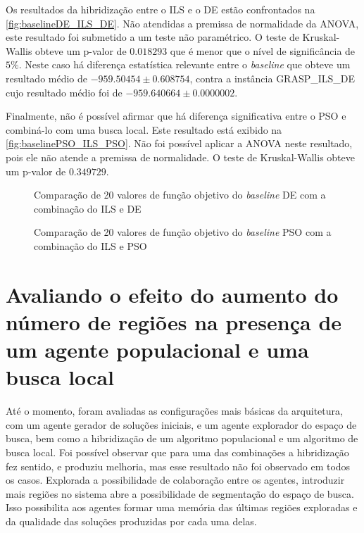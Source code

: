 Os resultados da hibridização entre o ILS e o DE estão confrontados na  \autoref{fig:baselineDE_ILS_DE}. Não atendidas a premissa de normalidade da ANOVA, este resultado foi submetido a um teste não paramétrico. O teste de Kruskal-Wallis obteve um p-valor de $0.018293$ que é menor que o nível de significância de $5\%$. Neste caso há diferença estatística relevante entre o \textit{baseline} que obteve um resultado médio de $-959.50454 \pm 0.608754$, contra a instância GRASP\_ILS\_DE cujo resultado médio foi de $-959.640664 \pm 0.0000002$. 

Finalmente, não é possível afirmar que há diferença significativa entre o PSO e combiná-lo com uma busca local. Este resultado está exibido na \autoref{fig:baselinePSO_ILS_PSO}. Não foi possível aplicar a ANOVA neste resultado, pois ele não atende a premissa de normalidade. O teste de Kruskal-Wallis obteve um p-valor de $0.349729$. 

\begin{figure}
    \centering
    
    \caption{Comparação de 20 valores de função objetivo do \textit{baseline} DE com a combinação do ILS e DE}
    \label{fig:baselineDE_ILS_DE}
\end{figure}

\begin{figure}
    \centering
    
    \caption{Comparação de 20 valores de função objetivo do \textit{baseline} PSO com a combinação do ILS e PSO}
    \label{fig:baselinePSO_ILS_PSO}
\end{figure}

\section{Avaliando o efeito do aumento do número de regiões na presença de um agente populacional e uma busca local}
\label{sec:aumentandoRegioes}
Até o momento, foram avaliadas as configurações mais básicas da arquitetura, com um agente gerador de soluções iniciais, e um agente explorador do espaço de busca, bem como a hibridização de um algoritmo populacional e um algoritmo de busca local. Foi possível observar que para uma das combinações a hibridização fez sentido, e produziu melhoria, mas esse resultado não foi observado em todos os casos. Explorada a possibilidade de colaboração entre os agentes, introduzir mais regiões no sistema abre a possibilidade de segmentação do espaço de busca. Isso possibilita aos agentes formar uma memória das últimas regiões exploradas e da qualidade das soluções produzidas por cada uma delas. 

